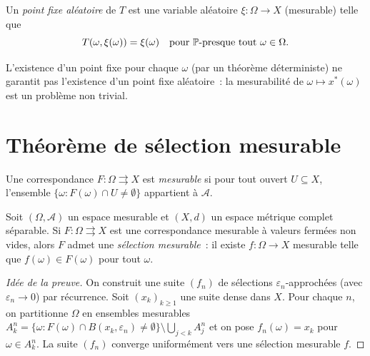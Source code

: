 \begin{definition}
Un \emph{point fixe al\'eatoire} de $T$ est une variable al\'eatoire
$\xi\colon \Omega \to X$ (mesurable) telle que
\[
  T(\omega, \xi(\omega)) = \xi(\omega) \quad \text{pour } \mathbb{P}\text{-presque tout } \omega \in \Omega.
\]
\end{definition}

\begin{remarque}
L'existence d'un point fixe pour chaque $\omega$ (par un th\'eor\`eme d\'eterministe) ne
garantit pas l'existence d'un point fixe al\'eatoire~: la mesurabilit\'e de
$\omega \mapsto x^*(\omega)$ est un probl\`eme non trivial.
\end{remarque}

\section{Th\'eor\`eme de s\'election mesurable}

\begin{definition}
Une correspondance $F\colon \Omega \rightrightarrows X$ est \emph{mesurable} si pour tout
ouvert $U \subseteq X$, l'ensemble $\{\omega : F(\omega) \cap U \neq \emptyset\}$
appartient \`a $\mathcal{A}$.
\end{definition}

\begin{theoreme}
\label{thm:selection-mesurable}
Soit $(\Omega, \mathcal{A})$ un espace mesurable et $(X, d)$ un espace m\'etrique complet
s\'eparable. Si $F\colon \Omega \rightrightarrows X$ est une correspondance mesurable
\`a valeurs ferm\'ees non vides, alors $F$ admet une \emph{s\'election mesurable}~:
il existe $f\colon \Omega \to X$ mesurable telle que $f(\omega) \in F(\omega)$ pour
tout $\omega$.
\end{theoreme}

\begin{proof}[Id\'ee de la preuve]
On construit une suite $(f_n)$ de s\'elections $\varepsilon_n$-approch\'ees (avec
$\varepsilon_n \to 0$) par r\'ecurrence. Soit $(x_k)_{k \geq 1}$ une suite dense dans $X$.
Pour chaque $n$, on partitionne $\Omega$ en ensembles mesurables
$A_k^n = \{\omega : F(\omega) \cap B(x_k, \varepsilon_n) \neq \emptyset\} \setminus
\bigcup_{j<k} A_j^n$ et on pose $f_n(\omega) = x_k$ pour $\omega \in A_k^n$. La suite
$(f_n)$ converge uniform\'ement vers une s\'election mesurable $f$.
\end{proof}

